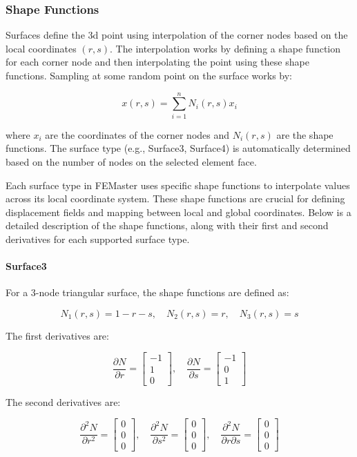 \subsubsection{Shape Functions}

Surfaces define the 3d point using interpolation of the corner nodes based on the local coordinates $(r, s)$.
The interpolation works by defining a shape function for each corner node and then interpolating the point using these shape functions.
Sampling at some random point on the surface works by:

\[
x(r, s) = \sum_{i=1}^{n} N_i(r, s) x_i
\]

where $x_i$ are the coordinates of the corner nodes and $N_i(r, s)$ are the shape functions.
The surface type (e.g., Surface3, Surface4) is automatically determined based on the number of nodes on the selected element face.

Each surface type in FEMaster uses specific shape functions to interpolate values across its local coordinate system.
These shape functions are crucial for defining displacement fields and mapping between local and global coordinates.
Below is a detailed description of the shape functions, along with their first and second derivatives for each supported surface type.

\paragraph{Surface3}
For a 3-node triangular surface, the shape functions are defined as:

\[
N_1(r, s) = 1 - r - s, \quad N_2(r, s) = r, \quad N_3(r, s) = s
\]

The first derivatives are:

\[
\frac{\partial N}{\partial r} =
\begin{bmatrix}
-1 \\
1 \\
0
\end{bmatrix}, \quad
\frac{\partial N}{\partial s} =
\begin{bmatrix}
-1 \\
0 \\
1
\end{bmatrix}
\]

The second derivatives are:

\[
\frac{\partial^2 N}{\partial r^2} =
\begin{bmatrix}
0 \\
0 \\
0
\end{bmatrix}, \quad
\frac{\partial^2 N}{\partial s^2} =
\begin{bmatrix}
0 \\
0 \\
0
\end{bmatrix}, \quad
\frac{\partial^2 N}{\partial r \partial s} =
\begin{bmatrix}
0 \\
0 \\
0
\end{bmatrix}
\]

